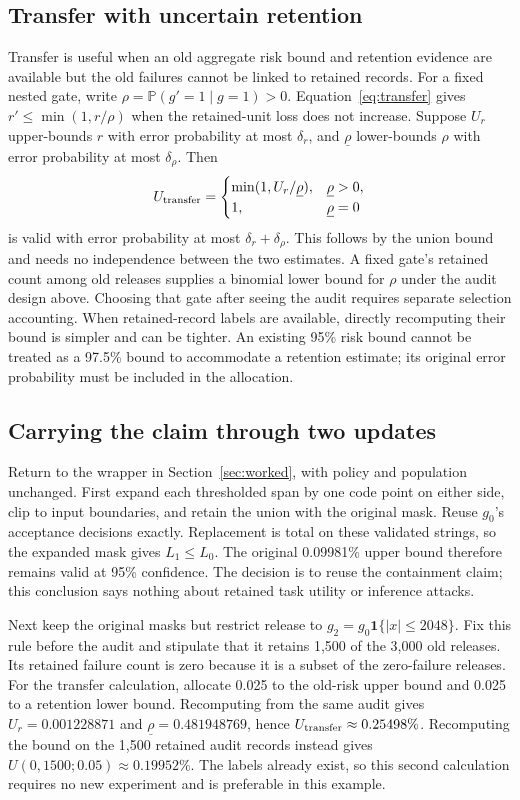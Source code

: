 \documentclass[conference]{IEEEtran}
\newcommand{\Prb}{\mathbb{P}}
\newcommand{\ind}{\mathbf{1}}
\begin{document}
\subsection{Transfer with uncertain retention}
\label{sec:transferaudit}
Transfer is useful when an old aggregate risk bound and retention evidence are available but the old failures cannot be linked to retained records. For a fixed nested gate, write $\rho=\Prb(g'=1\mid g=1)>0$. Equation~\eqref{eq:transfer} gives $r'\leq\min(1,r/\rho)$ when the retained-unit loss does not increase. Suppose $U_r$ upper-bounds $r$ with error probability at most $\delta_r$, and $\underline\rho$ lower-bounds $\rho$ with error probability at most $\delta_\rho$. Then
\begin{equation}
 U_{\rm transfer}=
 \begin{cases}
 \min(1,U_r/\underline\rho),&\underline\rho>0,\\
 1,&\underline\rho=0
 \end{cases}
\end{equation}
is valid with error probability at most $\delta_r+\delta_\rho$. This follows by the union bound and needs no independence between the two estimates. A fixed gate's retained count among old releases supplies a binomial lower bound for $\rho$ under the audit design above. Choosing that gate after seeing the audit requires separate selection accounting. When retained-record labels are available, directly recomputing their bound is simpler and can be tighter. An existing 95\% risk bound cannot be treated as a 97.5\% bound to accommodate a retention estimate; its original error probability must be included in the allocation.

\subsection{Carrying the claim through two updates}
\label{sec:workedupdates}
Return to the wrapper in Section~\ref{sec:worked}, with policy and population unchanged. First expand each thresholded span by one code point on either side, clip to input boundaries, and retain the union with the original mask. Reuse $g_0$'s acceptance decisions exactly. Replacement is total on these validated strings, so the expanded mask gives $L_1\leq L_0$. The original 0.09981\% upper bound therefore remains valid at 95\% confidence. The decision is to reuse the containment claim; this conclusion says nothing about retained task utility or inference attacks.

Next keep the original masks but restrict release to $g_2=g_0\ind\{|x|\leq2048\}$. Fix this rule before the audit and stipulate that it retains 1,500 of the 3,000 old releases. Its retained failure count is zero because it is a subset of the zero-failure releases. For the transfer calculation, allocate 0.025 to the old-risk upper bound and 0.025 to a retention lower bound. Recomputing from the same audit gives $U_r=0.001228871$ and $\underline\rho=0.481948769$, hence $U_{\rm transfer}\approx0.25498\%$. Recomputing the bound on the 1,500 retained audit records instead gives $U(0,1500;0.05)\approx0.19952\%$. The labels already exist, so this second calculation requires no new experiment and is preferable in this example.
\end{document}

